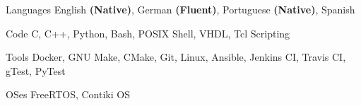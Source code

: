 
\begin{cvskills}
  \cvskill
    {Languages} %
    {English \textbf{(Native)}, German \textbf{(Fluent)}, Portuguese \textbf{(Native)}, Spanish} %

  \cvskill
    {Code} %
    {C, C++, Python, Bash, POSIX Shell, VHDL, Tcl Scripting} %

  \cvskill
    {Tools} %
    {Docker, GNU Make, CMake, Git, Linux, Ansible, Jenkins CI, Travis CI, gTest, PyTest} %

  \cvskill
    {OSes} %
    {FreeRTOS, Contiki OS} %
\end{cvskills}
